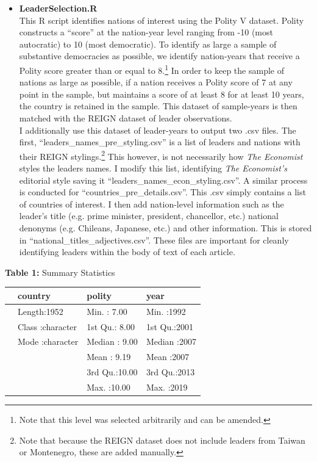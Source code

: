 \documentclass[11pt, letterpaper, twoside]{article}
\begin{document}
\begin{itemize}
    \item \textbf{LeaderSelection.R}\\
    This R script identifies nations of interest using the Polity V dataset. Polity constructs a ``score'' at the nation-year level ranging from -10 (most autocratic) to 10 (most democratic). To identify as large a sample of substantive democracies as possible, we identify nation-years that receive a Polity score greater than or equal to 8.\footnote{Note that this level was selected arbitrarily and can be amended.} In order to keep the sample of nations as large as possible, if a nation receives a Polity score of 7 at any point in the sample, but maintains a score of at least 8 for at least 10 years, the country is retained in the sample. This dataset of sample-years is then matched with the REIGN dataset of leader observations.\\

    I additionally use this dataset of leader-years to output two .csv files. The first, ``leaders\_names\_pre\_styling.csv'' is a list of leaders and nations with their REIGN stylings.\footnote{Note that because the REIGN dataset does not include leaders from Taiwan or Montenegro, these are added manually.} This however, is not necessarily how \textit{The Economist} styles the leaders names. I modify this list, identifying \textit{The Economist's} editorial style saving it ``leaders\_names\_econ\_styling.csv''. A similar process is conducted for ``countries\_pre\_details.csv''. This .csv simply contains a list of countries of interest. I then add nation-level information such as the leader's title (e.g. prime minister, president, chancellor, etc.) national denonyms (e.g. Chileans, Japanese, etc.) and other information. This is stored in ``national\_titles\_adjectives.csv''. These files are important for cleanly identifying leaders within the body of text of each article.
\end{itemize}

\begin{table}[ht]
    \centering
    \small{\textbf{Table 1:} Summary Statistics}
    \begin{tabular}{rlll}
      \hline
     &   country &     polity &      year \\ 
      \hline
     & Length:1952        & Min.   : 7.00   & Min.   :1992   \\ 
     & Class :character   & 1st Qu.: 8.00   & 1st Qu.:2001   \\ 
     & Mode  :character   & Median : 9.00   & Median :2007   \\ 
     &  & Mean   : 9.19   & Mean   :2007   \\ 
     &  & 3rd Qu.:10.00   & 3rd Qu.:2013   \\ 
     &  & Max.   :10.00   & Max.   :2019   \\ 
       \hline
    \end{tabular}
\end{table}
\end{document}

